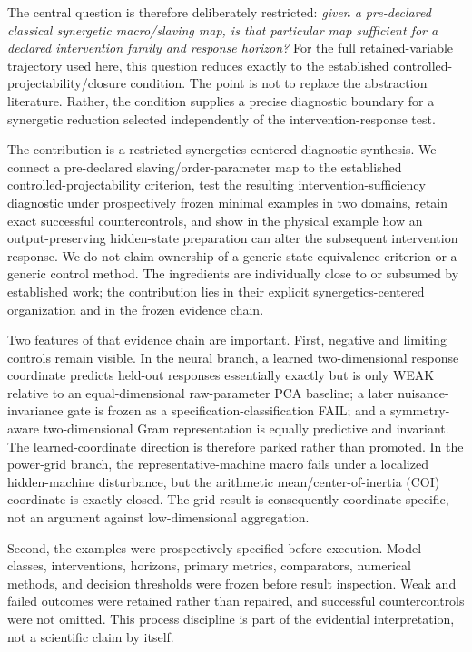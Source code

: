 The central question is therefore deliberately restricted: \emph{given a pre-declared classical synergetic macro/slaving map, is that particular map sufficient for a declared intervention family and response horizon?} For the full retained-variable trajectory used here, this question reduces exactly to the established controlled-projectability/closure condition. The point is not to replace the abstraction literature. Rather, the condition supplies a precise diagnostic boundary for a synergetic reduction selected independently of the intervention-response test.

The contribution is a restricted synergetics-centered diagnostic synthesis. We connect a pre-declared slaving/order-parameter map to the established controlled-projectability criterion, test the resulting intervention-sufficiency diagnostic under prospectively frozen minimal examples in two domains, retain exact successful countercontrols, and show in the physical example how an output-preserving hidden-state preparation can alter the subsequent intervention response. We do not claim ownership of a generic state-equivalence criterion or a generic control method. The ingredients are individually close to or subsumed by established work; the contribution lies in their explicit synergetics-centered organization and in the frozen evidence chain.

Two features of that evidence chain are important. First, negative and limiting controls remain visible. In the neural branch, a learned two-dimensional response coordinate predicts held-out responses essentially exactly but is only WEAK relative to an equal-dimensional raw-parameter PCA baseline; a later nuisance-invariance gate is frozen as a specification-classification FAIL; and a symmetry-aware two-dimensional Gram representation is equally predictive and invariant. The learned-coordinate direction is therefore parked rather than promoted. In the power-grid branch, the representative-machine macro fails under a localized hidden-machine disturbance, but the arithmetic mean/center-of-inertia (COI) coordinate is exactly closed. The grid result is consequently coordinate-specific, not an argument against low-dimensional aggregation.

Second, the examples were prospectively specified before execution. Model classes, interventions, horizons, primary metrics, comparators, numerical methods, and decision thresholds were frozen before result inspection. Weak and failed outcomes were retained rather than repaired, and successful countercontrols were not omitted. This process discipline is part of the evidential interpretation, not a scientific claim by itself.

